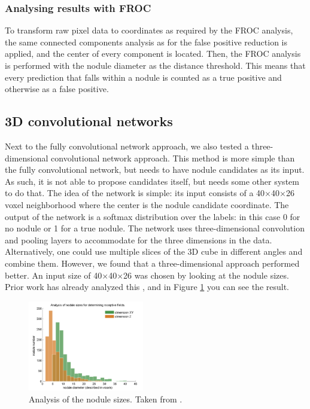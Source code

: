 \documentclass{article}
\begin{document}
\subsubsection{Analysing results with FROC}
To transform raw pixel data to coordinates as required by the FROC analysis, the same connected components analysis as for the false positive reduction is applied, and the center of every component is located. Then, the FROC analysis is performed with the nodule diameter as the distance threshold. This means that every prediction that falls within a nodule is counted as a true positive and otherwise as a false positive.

\subsection{3D convolutional networks}
Next to the fully convolutional network approach, we also tested a three-dimensional convolutional network approach.
This method is more simple than the fully convolutional network, but needs to have nodule candidates as its input.
As such, it is not able to propose candidates itself, but needs some other system to do that.
The idea of the network is simple: its input consists of a 40$\times$40$\times$26 voxel neighborhood where the center is the nodule candidate coordinate.
The output of the network is a softmax distribution over the labels: in this case 0 for no nodule or 1 for a true nodule.
The network uses three-dimensional convolution and pooling layers to accommodate for the three dimensions in the data.
Alternatively, one could use multiple slices of the 3D cube in different angles and combine them.
However, we found that a three-dimensional approach performed better.
An input size of 40$\times$40$\times$26 was chosen by looking at the nodule sizes.
Prior work has already analyzed this \cite{qidou}, and in Figure \ref{fig:nodulesizes} you can see the result.

\begin{figure}[tb]
	\centering
	\includegraphics[width=0.45\textwidth]{nodulesizes.png}
	\caption{Analysis of the nodule sizes. Taken from \cite{qidou}.}
	\label{fig:nodulesizes}
\end{figure}
\end{document}
